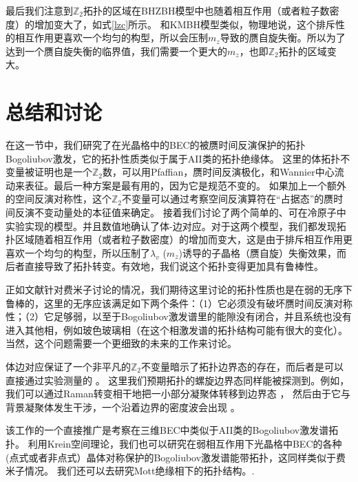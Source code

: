 最后我们注意到$\mathbb Z_2$拓扑的区域在BHZBH模型中也随着相互作用（或者粒子数密度）的增加变大了，如式\eqref{lzc}所示。
和KMBH模型类似，物理地说，这个排斥性的相互作用更喜欢一个均匀的构型，所以会压制$m_z$导致的赝自旋失衡。所以为了达到一个赝自旋失衡的临界值，我们需要一个更大的$m_z$，也即$\mathbb Z_2$拓扑的区域变大。

\section{总结和讨论}\label{sec5}
在这一节中，我们研究了在光晶格中的BEC的被赝时间反演保护的拓扑Bogoliubov激发，它的拓扑性质类似于属于AII类的拓扑绝缘体。
这里的体拓扑不变量被证明也是一个$\mathbb Z_2$数，可以用Pfaffian，赝时间反演极化，和Wannier中心流动来表征。最后一种方案是最有用的，因为它是规范不变的。
如果加上一个额外的空间反演对称性，这个$\mathbb Z_2$不变量可以通过考察空间反演算符在“占据态”的赝时间反演不变动量处的本征值来确定。
接着我们讨论了两个简单的、可在冷原子中实验实现的模型。并且数值地确认了体-边对应。对于这两个模型，我们都发现拓扑区域随着相互作用（或者粒子数密度）的增加而变大，这是由于排斥相互作用更喜欢一个均匀的构型，所以压制了$\lambda_v$ ($m_z$)诱导的子晶格（赝自旋）失衡效果，而后者直接导致了拓扑转变。有效地，我们说这个拓扑变得更加具有鲁棒性。

正如文献\cite{ShunQingShen}针对费米子讨论的情况，我们期待这里讨论的拓扑性质也是在弱的无序下鲁棒的，这里的无序应该满足如下两个条件：（1）它必须没有破坏赝时间反演对称性；（2）它足够弱，以至于Bogoliubov激发谱里的能隙没有闭合，并且系统也没有进入其他相，例如玻色玻璃相（在这个相激发谱的拓扑结构可能有很大的变化）。当然，这个问题需要一个更细致的未来的工作来讨论。

体边对应保证了一个非平凡的$\mathbb Z_2$不变量暗示了拓扑边界态的存在，而后者是可以直接通过实验测量的 \cite{Goldman2012,Goldman2013,Goldman2013a,Celi2015}。
这里我们预期拓扑的螺旋边界态同样能被探测到。例如，我们可以通过Raman转变相干地把一小部分凝聚体转移到边界态 \cite{Ernst2009}，
然后由于它与背景凝聚体发生干涉，一个沿着边界的密度波会出现 \cite{Furukawa2015}。

该工作的一个直接推广是考察在三维BEC中类似于AII类的Bogoliubov激发谱拓扑\cite{Fu2007a,Kondo2019a}。
利用Krein空间理论，我们也可以研究在弱相互作用下光晶格中BEC的各种(点式或者非点式）晶体对称保护的Bogoliubov激发谱能带拓扑，这同样类似于费米子情况\cite{Ando2015}。
我们还可以去研究Mott绝缘相下的拓扑结构。\cite{Vasic2015,Wu2017}.

